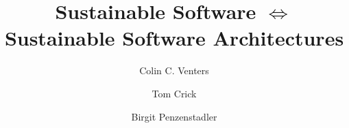 \documentclass[preprint,12pt,authoryear]{elsarticle}
\begin{document}
\begin{frontmatter}



\title{Sustainable Software $\iff$ Sustainable Software Architectures}


\author[hudd]{Colin C. Venters}
\author[cmu]{Tom Crick}
\author[csu]{Birgit Penzenstadler}
\address[hudd]{School of Computing \& Engineering, University of
  Huddersfield, UK}
\address[cmu]{Department of Computing \& Information Systems, Cardiff
  Metropolitan University, UK}
\address[csu]{Department of Computer Engineering \& Computer Science, California State University, Long Beach, USA}



\end{frontmatter}
\end{document}
